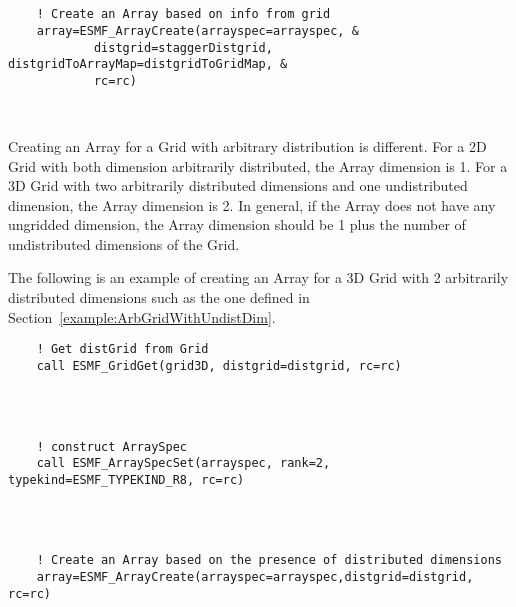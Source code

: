 
 \begin{verbatim}


    ! Create an Array based on info from grid
    array=ESMF_ArrayCreate(arrayspec=arrayspec, &
            distgrid=staggerDistgrid, distgridToArrayMap=distgridToGridMap, &
            rc=rc)

 
\end{verbatim}
 

   Creating an Array for a Grid with arbitrary distribution is different.
   For a 2D Grid with both dimension arbitrarily distributed, the Array dimension
   is 1.  For a 3D Grid with two arbitrarily distributed dimensions and one
   undistributed dimension, the Array dimension is 2.  In general,
   if the Array does not have any ungridded dimension, the Array dimension
   should be 1 plus the number of undistributed dimensions of the Grid.
  
   The following is an example of creating an Array for a 3D Grid with 2
   arbitrarily distributed dimensions such as the one defined in Section~\ref{example:ArbGridWithUndistDim}. 

 \begin{verbatim}
    ! Get distGrid from Grid
    call ESMF_GridGet(grid3D, distgrid=distgrid, rc=rc)
 
\end{verbatim}
 

 \begin{verbatim}


    ! construct ArraySpec
    call ESMF_ArraySpecSet(arrayspec, rank=2, typekind=ESMF_TYPEKIND_R8, rc=rc)
 
\end{verbatim}
 

 \begin{verbatim}


    ! Create an Array based on the presence of distributed dimensions
    array=ESMF_ArrayCreate(arrayspec=arrayspec,distgrid=distgrid, rc=rc)

 
\end{verbatim}
 
